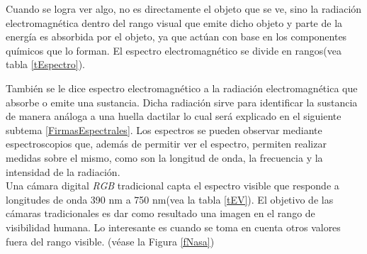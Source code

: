 Cuando se logra ver algo, no es directamente el objeto que se ve, sino la radiación electromagnética dentro del rango visual que emite dicho objeto y parte de la energía es absorbida por el objeto, ya que actúan con base en los componentes químicos que lo forman. El espectro electromagnético se divide en rangos(vea tabla \ref{tEspectro}). 

También se le dice espectro electromagnético a la radiación electromagnética que absorbe o emite una sustancia. Dicha radiación sirve para identificar la sustancia de manera análoga a una huella dactilar lo cual será explicado en el siguiente subtema \ref{FirmasEspectrales}. Los espectros se pueden observar mediante espectroscopios que, además de permitir ver el espectro, permiten realizar medidas sobre el mismo, como son la longitud de onda, la frecuencia y la intensidad de la radiación.\\
Una cámara digital \textit{RGB} tradicional capta el espectro visible que responde a longitudes de onda 390 nm a 750 nm(vea la tabla \ref{tEV}). El objetivo de las cámaras tradicionales es dar como resultado una imagen en el rango de visibilidad humana. Lo interesante es cuando se toma en cuenta otros valores fuera del rango visible. (véase la Figura \ref{fNasa})

